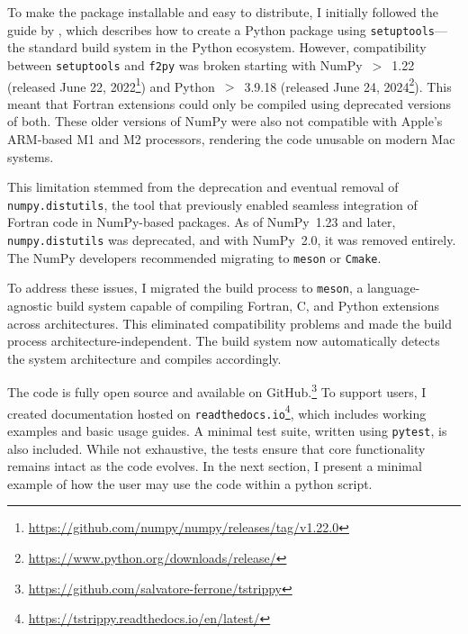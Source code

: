 \documentclass{article}
\begin{document}
    To make the package installable and easy to distribute, I initially followed the guide by \citet{pythonpackagingguide}, which describes how to create a Python package using \texttt{setuptools}—the standard build system in the Python ecosystem. However, compatibility between \texttt{setuptools} and \texttt{f2py} was broken starting with NumPy~$>$~1.22 (released June 22, 2022\footnote{\url{https://github.com/numpy/numpy/releases/tag/v1.22.0}}) and Python~$>$~3.9.18 (released June 24, 2024\footnote{\url{https://www.python.org/downloads/release/}}). This meant that Fortran extensions could only be compiled using deprecated versions of both. These older versions of NumPy were also not compatible with Apple's ARM-based M1 and M2 processors, rendering the code unusable on modern Mac systems.

    This limitation stemmed from the deprecation and eventual removal of \texttt{numpy.distutils}, the tool that previously enabled seamless integration of Fortran code in NumPy-based packages. As of NumPy~1.23 and later, \texttt{numpy.distutils} was deprecated, and with NumPy~2.0, it was removed entirely. The NumPy developers recommended migrating to \texttt{meson} \citep{meson_manual} or \texttt{Cmake}.

    To address these issues, I migrated the build process to \texttt{meson}, a language-agnostic build system capable of compiling Fortran, C, and Python extensions across architectures. This eliminated compatibility problems and made the build process architecture-independent. The build system now automatically detects the system architecture and compiles accordingly.

    The code is fully open source and available on GitHub.\footnote{\url{https://github.com/salvatore-ferrone/tstrippy}} To support users, I created documentation hosted on \texttt{readthedocs.io}\footnote{\url{https://tstrippy.readthedocs.io/en/latest/}}, which includes working examples and basic usage guides. A minimal test suite, written using \texttt{pytest}, is also included. While not exhaustive, the tests ensure that core functionality remains intact as the code evolves. In the next section, I present a minimal example of how the user may use the code within a python script.
\end{document}
